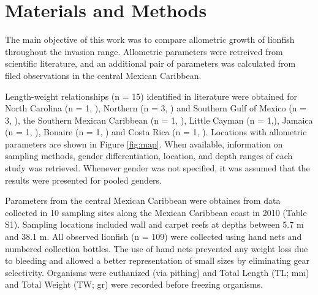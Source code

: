 \documentclass[fleqn,10pt,lineno]{wlpeerj} %
\begin{document}
\section{Materials and Methods}\label{materials-and-methods}

The main objective of this work was to compare allometric growth of
lionfish throughout the invasion range. Allometric parameters were
retreived from scientific literature, and an additional pair of
parameters was calculated from filed observations in the central Mexican
Caribbean.

Length-weight relationships (n = 15) identified in literature were
obtained for North Carolina (n = 1, \citet{barbour_2011}), Northern (n =
3, \citet{fogg_2013}) and Southern Gulf of Mexico (n = 3,
\citet{aguilarperera_2016}), the Southern Mexican Caribbean (n = 1,
\citet{sabidoitza_2016}), Little Cayman (n = 1,\citet{edwards_2014}),
Jamaica (n = 1, \citet{chin_2016}), Bonaire (n = 1, \citet{deleon_2013})
and Costa Rica (n = 1, \citet{sandel_2015}). Locations with allometric
parameters are shown in Figure \ref{fig:map}. When available,
information on sampling methods, gender differentiation, location, and
depth ranges of each study was retrieved. Whenever gender was not
specified, it was assumed that the results were presented for pooled
genders.

Parameters from the central Mexican Caribbean were obtaines from data
collected in 10 sampling sites along the Mexican Caribbean coast in 2010
(Table S1). Sampling locations included wall and carpet reefs at depths
between 5.7 m and 38.1 m. All observed lionfish (n = 109) were collected
using hand nets and numbered collection bottles. The use of hand nets
prevented any weight loss due to bleeding and allowed a better
representation of small sizes by eliminating gear selectivity. Organisms
were euthanized (via pithing) and Total Length (TL; mm) and Total Weight
(TW; gr) were recorded before freezing organisms.

\clearpage
\end{document}
